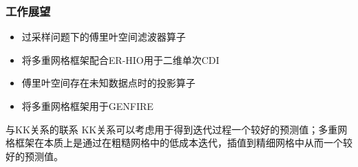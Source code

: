 \documentclass[10pt,aspectratio=169]{beamer} %
\begin{document}
\begin{frame}
    \frametitle{工作展望}
    \begin{itemize}
        \item 过采样问题下的傅里叶空间滤波器算子
        \item 将多重网格框架配合ER-HIO用于二维单次CDI
        \item 傅里叶空间存在未知数据点时的投影算子
        \item 将多重网格框架用于GENFIRE
    \end{itemize}
    \begin{block}{与KK关系的联系}
        KK关系可以考虑用于得到迭代过程一个较好的预测值；多重网格框架在本质上是通过在粗糙网格中的低成本迭代，插值到精细网格中从而一个较好的预测值。
    \end{block}
\end{frame}
\end{document}
